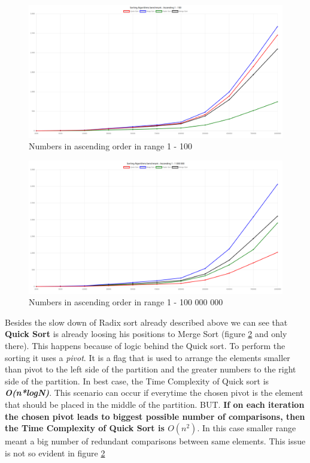 \documentclass[12pt]{article}
\begin{document}
\begin{figure}[h]
    \centering
    \includegraphics[width=1\textwidth]{ascen100.png}
    \caption{Numbers in ascending order in range 1 - 100}
    \label{fig:ascending100}
\end{figure}

\begin{figure}[h]
    \centering
    \includegraphics[width=1\textwidth]{ascen1000000.png}
    \caption{Numbers in ascending order in range 1 - 100 000 000}
    \label{fig:ascending1000000}
\end{figure}
\clearpage
Besides the slow down of Radix sort already described above we can see that \textbf{Quick Sort} is already loosing
his positions to Merge Sort (figure \ref{fig:ascending1000000} and only there). This happens because of logic behind the Quick sort. To 
perform the sorting it uses a \textit{pivot}. It is a flag that is used to arrange the 
elements smaller than pivot to the left side of the partition 
and the greater numbers to the right side of the partition. 
In best case, the Time Complexity of Quick sort 
is \textbf{\textit{O(n*logN)}}. This scenario can occur if everytime the chosen pivot is the element that should
be placed in the middle of the partition. BUT. \textbf{If on each iteration the chosen pivot 
leads to biggest possible number of comparisons, then the Time Complexity 
of Quick Sort is \textit{$O(n^2)$}}. In this case smaller range meant a big number of redundant comparisons 
between same elements. This issue is not so evident in figure \ref{fig:ascending1000000}
\end{document}

